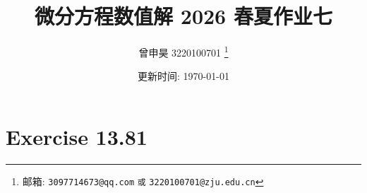 \documentclass[a4paper]{article}
\begin{document}
\title{微分方程数值解 2026 春夏作业七}

\author{曾申昊 3220100701
  \thanks{邮箱: \texttt{3097714673@qq.com}
                            \texttt{或} \texttt{3220100701@zju.edu.cn}}}

\date{更新时间: \today}

\maketitle


\section*{Exercise 13.81}
\end{document}

